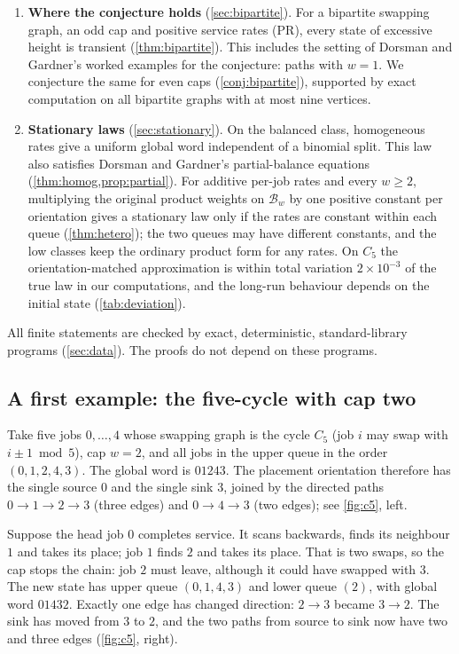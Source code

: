 \documentclass[11pt,a4paper]{article}
\theoremstyle{plain}
\theoremstyle{plain}
\newcommand{\Bal}{\mathcal{B}}
\begin{document}
\begin{enumerate}[label=\textbf{C\arabic*.},leftmargin=*]
\item \textbf{Where the conjecture holds} (\cref{sec:bipartite}). For a bipartite swapping graph, an odd cap and positive service rates (PR), every state of excessive height is transient (\cref{thm:bipartite}). This includes the setting of Dorsman and Gardner's worked examples for the conjecture: paths with $w=1$. We conjecture the same for even caps (\cref{conj:bipartite}), supported by exact computation on all bipartite graphs with at most nine vertices.
\item \textbf{Stationary laws} (\cref{sec:stationary}). On the balanced class, homogeneous rates give a uniform global word independent of a binomial split. This law also satisfies Dorsman and Gardner's partial-balance equations (\cref{thm:homog,prop:partial}). For additive per-job rates and every $w\ge2$, multiplying the original product weights on $\Bal_w$ by one positive constant per orientation gives a stationary law only if the rates are constant within each queue (\cref{thm:hetero}); the two queues may have different constants, and the low classes keep the ordinary product form for any rates. On $C_5$ the orientation-matched approximation is within total variation $2\times10^{-3}$ of the true law in our computations, and the long-run behaviour depends on the initial state (\cref{tab:deviation}).
\end{enumerate}

All finite statements are checked by exact, deterministic, standard-library programs (\cref{sec:data}). The proofs do not depend on these programs.

\subsection{A first example: the five-cycle with cap two}\label{sec:firstexample}

Take five jobs $0,\dots,4$ whose swapping graph is the cycle $C_5$ (job $i$ may swap with $i\pm1 \bmod 5$), cap $w=2$, and all jobs in the upper queue in the order $(0,1,2,4,3)$. The global word is $01243$. The placement orientation therefore has the single source $0$ and the single sink $3$, joined by the directed paths $0\to1\to2\to3$ (three edges) and $0\to4\to3$ (two edges); see \cref{fig:c5}, left.

Suppose the head job $0$ completes service. It scans backwards, finds its neighbour $1$ and takes its place; job $1$ finds $2$ and takes its place. That is two swaps, so the cap stops the chain: job $2$ must leave, although it could have swapped with $3$. The new state has upper queue $(0,1,4,3)$ and lower queue $(2)$, with global word $01432$. Exactly one edge has changed direction: $2\to3$ became $3\to2$. The sink has moved from $3$ to $2$, and the two paths from source to sink now have two and three edges (\cref{fig:c5}, right).
\end{document}
